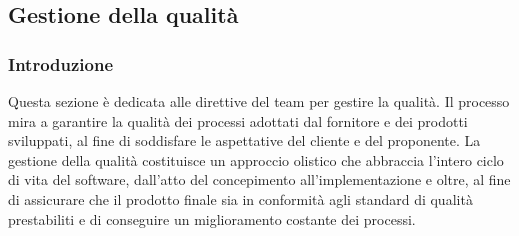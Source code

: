 \subsection{Gestione della qualità}
\subsubsection{Introduzione}
Questa sezione è dedicata alle direttive del team per gestire la qualità. Il processo mira a garantire la qualità dei processi adottati dal fornitore e dei prodotti sviluppati, al fine di soddisfare le aspettative del cliente e del proponente.
La gestione della qualità costituisce un approccio olistico che abbraccia l'intero ciclo di vita del software, dall'atto del concepimento all'implementazione e oltre, al fine di assicurare che il prodotto finale sia in conformità agli standard di qualità prestabiliti e di conseguire un miglioramento costante dei processi.


